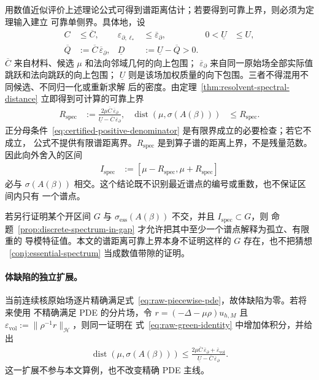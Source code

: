用数值近似评价上述理论公式可得到谱距离估计；若要得到可靠上界，则必须为定理输入建立
可靠单侧界。具体地，设
\begin{align}
  C&\leq\overline C,
  &\varepsilon_{\partial,\ell_*}&\leq\overline\varepsilon_\partial,
  &0<\underline U&\leq U,
  \label{eq:certified-one-sided-inputs}\\
  \overline Q&:=\overline C\,\overline\varepsilon_\partial,
  &\underline D&:=\underline U-\overline Q>0.
  \label{eq:certified-positive-denominator}
\end{align}
$\overline C$ 来自材料、候选 $\mu$ 和法向邻域几何的向上包围；
$\overline\varepsilon_\partial$ 来自同一原始场全部实际值跳跃和法向跳跃的向上包围；
$\underline U$ 则是该场加权质量的向下包围。三者不得混用不同候选、不同归一化或重新求解
后的密度。由定理~\ref{thm:resolvent-spectral-distance} 立即得到可计算的可靠上界
\begin{align}
  R_{\mathrm{spec}}
  &:=\frac{2\mu\overline C\,\overline\varepsilon_\partial}
    {\underline U-\overline C\,\overline\varepsilon_\partial},
  &\operatorname{dist}\!\left(\mu,\sigma(A(\beta))\right)
  &\leq R_{\mathrm{spec}}.
  \label{eq:certified-spectral-distance}
\end{align}
正分母条件~\eqref{eq:certified-positive-denominator} 是有限界成立的必要检查；若它不成立，
公式不提供有限谱距离界。$R_{\mathrm{spec}}$ 是到算子谱的距离上界，不是残量范数。
因此向外舍入的区间
\begin{align}
  I_{\mathrm{spec}}
  &:=[\mu-R_{\mathrm{spec}},\mu+R_{\mathrm{spec}}]
  \label{eq:certified-spectral-interval}
\end{align}
必与 $\sigma(A(\beta))$ 相交。这个结论既不识别最近谱点的编号或重数，也不保证区间内只有
一个谱点。

若另行证明某个开区间 $G$ 与 $\sigma_{\mathrm{ess}}(A(\beta))$ 不交，并且
$I_{\mathrm{spec}}\subset G$，则
命题~\ref{prop:discrete-spectrum-in-gap} 才允许把其中至少一个谱点解释为孤立、有限重的
导模特征值。本文的谱距离可靠上界本身不证明这样的 $G$ 存在，也不把猜想
~\ref{conj:essential-spectrum} 当成数值带隙的证明。

\paragraph{体缺陷的独立扩展。}
当前连续核原始场逐片精确满足式~\eqref{eq:raw-piecewise-pde}，故体缺陷为零。若将来使用
不精确满足 PDE 的分片场，令
$r=(-\Delta-\mu\rho)u_{h,M}$ 且
$\varepsilon_{\mathrm{vol}}:=\lVert\rho^{-1}r\rVert_{\mathcal H}$，则同一证明在
式~\eqref{eq:raw-green-identity} 中增加体积分，并给出
\begin{align*}
  \operatorname{dist}\!\left(\mu,\sigma(A(\beta))\right)
  \leq
  \frac{2\mu\overline C\,\overline\varepsilon_\partial
    +\overline\varepsilon_{\mathrm{vol}}}
  {\underline U-\overline C\,\overline\varepsilon_\partial}.
\end{align*}
这一扩展不参与本文算例，也不改变精确 PDE 主线。
